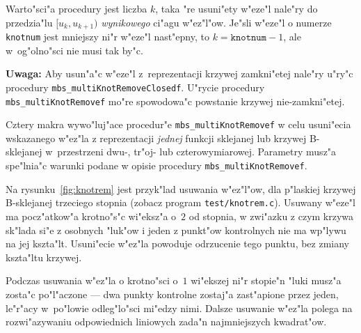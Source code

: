 Warto"sci"a procedury jest liczba $k$, taka "re usuni"ety w"eze"l nale"ry do
przedzia"lu $[u_k,u_{k+1})$ \emph{wynikowego} ci"agu w"ez"l"ow. Je"sli
w"eze"l o numerze \texttt{knotnum} jest mniejszy ni"r w"eze"l nast"epny, to
$k=\texttt{knotnum}-1$, ale w~og"olno"sci nie musi tak by"c.

\vspace{\medskipamount}
\noindent
\textbf{Uwaga:} Aby usun"a"c w"eze"l z~reprezentacji krzywej zamkni"etej
nale"ry u"ry"c procedury \texttt{mbs\_multiKnotRemoveClosedf}.
U"rycie procedury \texttt{mbs\_multiKnotRemovef} mo"re spowodowa"c powstanie
krzywej nie-zamkni"etej.

\vspace{\bigskipamount}
Cztery makra wywo"luj"ace procedur"e \texttt{mbs\_multiKnotRemovef} w celu
usuni"ecia wskazanego w"ez"la z reprezentacji \emph{jednej} funkcji
sklejanej lub krzywej B-sklejanej w~przestrzeni dwu-, tr"oj- lub
czterowymiarowej. Parametry musz"a spe"lnia"c warunki podane w opisie
procedury \texttt{mbs\_multiKnotRemovef}.

Na rysunku~\ref{fig:knotrem} jest przyk"lad usuwania w"ez"l"ow, dla
p"laskiej krzywej B-sklejanej trzeciego stopnia (zobacz program
\texttt{test/knotrem.c}). Usuwany w"eze"l ma pocz"atkow"a krotno"s"c
wi"eksz"a o~$2$ od stopnia, w zwi"azku z czym krzywa sk"lada si"e z osobnych
"luk"ow i jeden z punkt"ow kontrolnych nie ma wp"lywu na jej kszta"lt.
Usuni"ecie w"ez"la powoduje odrzucenie tego punktu, bez zmiany kszta"ltu
krzywej.

Podczas usuwania w"ez"la o krotno"sci o~$1$ wi"ekszej ni"r stopie"n "luki
musz"a zosta"c po"l"aczone --- dwa punkty kontrolne zostaj"a zast"apione
przez jeden, le"r"acy w~po"lowie odleg"lo"sci mi"edzy nimi. Dalsze usuwanie
w"ez"la polega na rozwi"azywaniu odpowiednich liniowych zada"n najmniejszych
kwadrat"ow.


